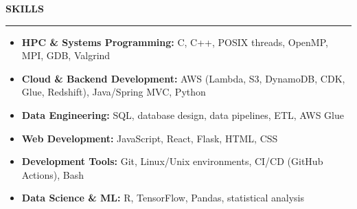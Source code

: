 \documentclass[11pt,a4paper]{article}
\newcommand{\sectionheading}[1]{\vspace{0.2cm}\textbf{\Large #1}\vspace{0.1cm}\hrule\vspace{0.3cm}}
\newcommand{\subheading}[1]{\textbf{#1}}
\newcommand{\daterange}[1]{\hfill{#1}}
\begin{document}


\sectionheading{SKILLS}
\begin{itemize}[leftmargin=*,nosep]
    \item \textbf{HPC \& Systems Programming:} C, C++, POSIX threads, OpenMP, MPI, GDB, Valgrind
    \item \textbf{Cloud \& Backend Development:} AWS (Lambda, S3, DynamoDB, CDK, Glue, Redshift), Java/Spring MVC, Python
    \item \textbf{Data Engineering:} SQL, database design, data pipelines, ETL, AWS Glue
    \item \textbf{Web Development:} JavaScript, React, Flask, HTML, CSS
    \item \textbf{Development Tools:} Git, Linux/Unix environments, CI/CD (GitHub Actions), Bash
    \item \textbf{Data Science \& ML:} R, TensorFlow, Pandas, statistical analysis
\end{itemize}
\end{document}
